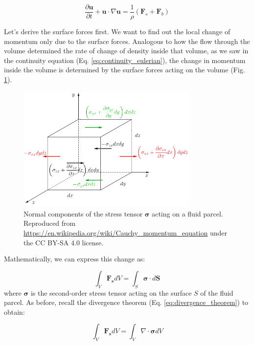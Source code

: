\documentclass[12pt]{article}
\numberwithin{equation}{section}
\numberwithin{figure}{section}
\numberwithin{table}{section}
\begin{document}
\begin{equation}
  \frac{\partial \mathbf{u}}{\partial t} + \mathbf{u} \cdot \nabla \mathbf{u} = \frac{1}{\rho} (\mathbf{F}_s + \mathbf{F}_b)
\end{equation}

Let's derive the surface forces first.
We want to find out the local change of momentum only due to the surface forces.
Analogous to how the flow through the volume determined the rate of change of
density inside that volume, as we saw in the continuity equation
(Eq. \ref{eq:continuity_eulerian}), the change in momentum inside the volume
is determined by the surface forces acting on the volume (Fig. \ref{fig:momentum1}).

\begin{figure}[h]
  \centering
  \includegraphics[width=0.8\textwidth]{assets/fig_momentum1.png}
  \caption{
    Normal components of the stress tensor $\mathbf{\sigma}$ acting on a fluid parcel.
    Reproduced from \url{https://en.wikipedia.org/wiki/Cauchy_momentum_equation}
    under the CC BY-SA 4.0 license.
  }
  \label{fig:momentum1}
\end{figure}

Mathematically, we can express this change as:

\begin{equation}
  \int_V \mathbf{F_s} dV = \int_S \boldsymbol{\sigma} \cdot d\mathbf{S}
\end{equation}
where $\boldsymbol{\sigma}$ is the second-order stress tensor acting on the
surface $S$ of the fluid parcel.
As before, recall the divergence theorem (Eq. \ref{eq:divergence_theorem}) to obtain:

\begin{equation}
  \int_V \mathbf{F_s} dV = \int_V \nabla \cdot \boldsymbol{\sigma} dV
\end{equation}
\end{document}
